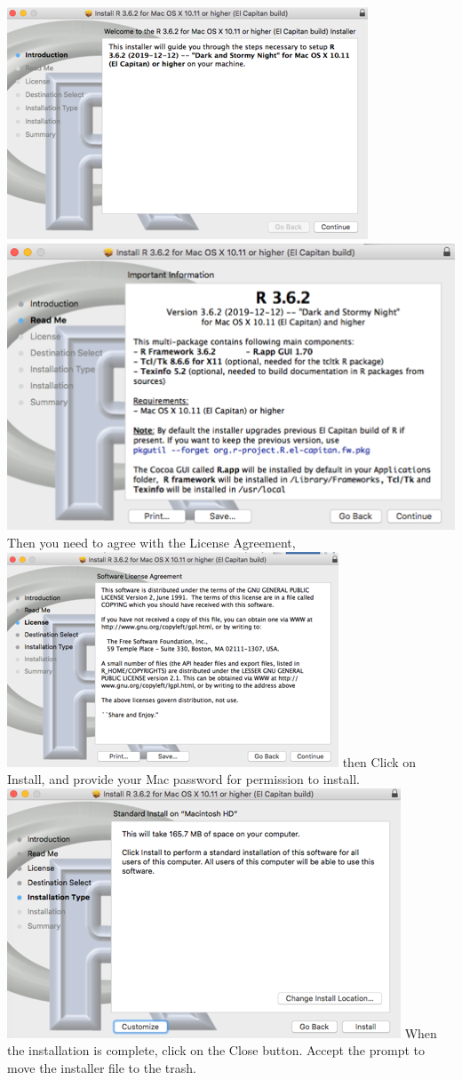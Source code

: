 \documentclass[
]{book}
\begin{document}
\includegraphics{images/installrCont1mac.png}
\includegraphics{images/installrCont2mac.png}
Then you need to agree with the License Agreement,
\includegraphics{images/installrmacLicense.png}
then Click on Install, and provide your Mac password for permission to install.
\includegraphics{images/installrmac-install.png}
When the installation is complete, click on the Close button. Accept the prompt to move the installer file to the trash.
\end{document}
